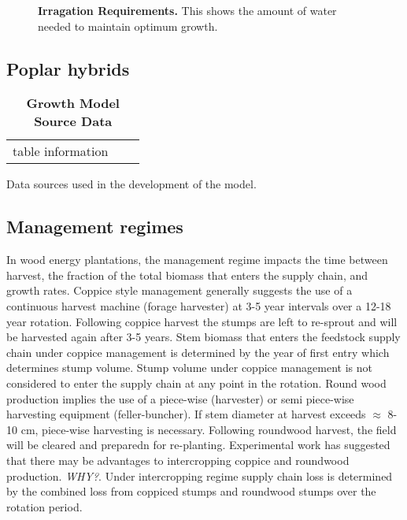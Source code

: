 \documentclass[10pt]{article}
\begin{document}
\begin{figure}[!ht]
\begin{center}
\end{center}
\caption{ {\bf Irragation Requirements.} This shows the amount of
  water needed to maintain optimum growth.} 
\label{fig:growth-map}
\end{figure}

\subsection*{Poplar hybrids}

\begin{table}[!ht]
\caption{
\bf{Growth Model Source Data}}
\begin{tabular}{|c|c|c|}
table information
\end{tabular}
\begin{flushleft}Data sources used in the development of the model.
\end{flushleft}
\label{tab:data}
 \end{table}


\subsection*{Management regimes}
\label{sec:management-reg}
In wood energy plantations, the management regime impacts the time
between harvest, the fraction of the total biomass that enters the
supply chain, and growth rates. Coppice style management generally suggests the use
of a continuous harvest machine (forage harvester) at 3-5 year
intervals over a 12-18 year rotation. Following coppice harvest the stumps are left to
re-sprout and will be harvested again after 3-5 years.  Stem biomass that
enters the feedstock supply chain under coppice management is determined
by the year of first entry which determines stump volume.  Stump
volume under coppice management is not considered to enter the supply
chain at any point in the rotation. Round wood production implies the
use of a piece-wise (harvester) or semi piece-wise harvesting
equipment (feller-buncher). If stem diameter at harvest exceeds
$\approx$ 8-10 cm, piece-wise harvesting is necessary. Following 
roundwood harvest, the field will be cleared and preparedn for
re-planting. Experimental work has suggested that there may be advantages to intercropping
coppice and roundwood production. \emph{WHY?}. Under intercropping
regime supply chain loss is determined by the combined loss from
coppiced stumps and roundwood stumps over the rotation period.
\end{document}
